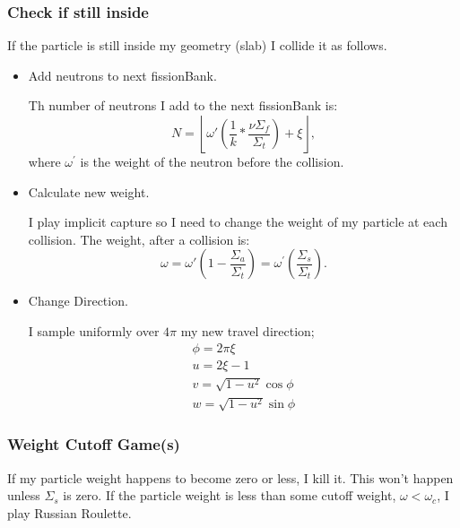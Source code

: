 \documentclass[11pt]{article}
\begin{document}
\subsubsection{Check if still inside}  If the particle is still inside my geometry (slab) I collide it as follows.
\begin{itemize}
    \item Add neutrons to next fissionBank.

    Th number of neutrons I add to the next fissionBank is:
    \begin{equation}
        N = \left\lfloor \omega'\left( \frac{1}{k}*\frac{\nu\Sigma_f}{\Sigma_t}\right) +  \xi \right\rfloor,
    \end{equation}
    where $\omega^{\prime}$ is the weight of the neutron before the collision.

    \item Calculate new weight.

    I play implicit capture so I need to change the weight of my particle at each collision.  The weight, after a collision is:
    \begin{equation}
        \omega = \omega'\left(1 - \frac{\Sigma_a}{\Sigma_t}\right) = \omega^{\prime}\left(\frac{\Sigma_s}{\Sigma_t}\right).
    \end{equation}

    \item Change Direction.

    I sample uniformly over $4\pi$ my new travel direction;
    \begin{subequations}
        \begin{gather}
            \phi = 2\pi\xi \\
            u = 2\xi - 1 \\
            v = \sqrt{1-u^2}\cos{\phi} \\
            w = \sqrt{1-u^2}\sin{\phi}
        \end{gather}
    \end{subequations}
\end{itemize}

\subsubsection{Weight Cutoff Game(s)}  If my particle weight happens to become zero or less, I kill it.  This won't happen unless $\Sigma_s$ is zero.  If the particle weight is less than some cutoff weight, $\omega < \omega_c$, I play Russian Roulette.
\end{document}
